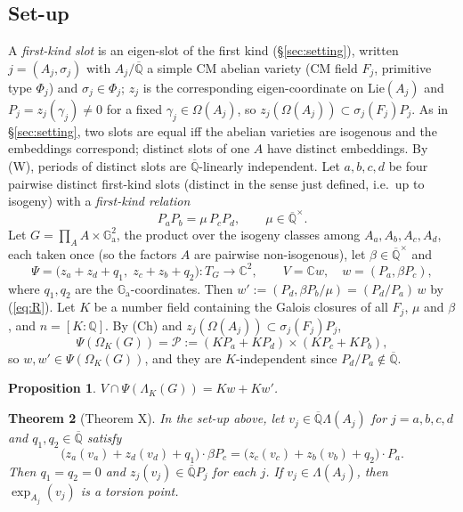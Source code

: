 \documentclass[11pt]{amsart}
\newtheorem{theorem}{Theorem}[section]
\newtheorem{proposition}[theorem]{Proposition}
\theoremstyle{definition}
\newcommand{\Qb}{\overline{\mathbb{Q}}}
\newcommand{\C}{\mathbb{C}}
\newcommand{\Q}{\mathbb{Q}}
\newcommand{\Ga}{\mathbb{G}_{\mathrm a}}
\begin{document}
\subsection{Set-up}
A \emph{first-kind slot} is an eigen-slot of the first kind (\S\ref{sec:setting}), written $j=(A_j,\sigma_j)$ with
$A_j/\Qb$ a simple CM abelian variety (CM field $F_j$, primitive type $\Phi_j$) and $\sigma_j\in\Phi_j$; $z_j$ is the
corresponding eigen-coordinate on $\mathrm{Lie}(A_j)$ and $P_j=z_j(\gamma_j)\ne0$ for a fixed $\gamma_j\in\Omega(A_j)$, so
$z_j(\Omega(A_j))\subset\sigma_j(F_j)P_j$. As in \S\ref{sec:setting}, two slots are equal iff the abelian varieties are
isogenous and the embeddings correspond; distinct slots of one $A$ have distinct embeddings. By (W), periods of distinct slots are $\Qb$-linearly independent. Let $a,b,c,d$ be four pairwise distinct
first-kind slots (distinct in the sense just defined, i.e.\ up to isogeny) with a \emph{first-kind relation}
\begin{equation}\label{eq:R}
P_aP_b=\mu\,P_cP_d,\qquad\mu\in\Qb^\times .
\end{equation}
Let $G=\prod_A A\times\Ga^2$, the product over the isogeny classes among $A_a,A_b,A_c,A_d$, each taken once (so the factors $A$ are pairwise non-isogenous), let
$\beta\in\Qb^\times$ and
\[
\Psi=\bigl(z_a+z_d+q_1,\;z_c+z_b+q_2\bigr)\colon T_G\to\C^2,\qquad V=\C w,\quad w=(P_a,\beta P_c),
\]
where $q_1,q_2$ are the $\Ga$-coordinates. Then $w':=(P_d,\beta P_b/\mu)=(P_d/P_a)\,w$ by (\ref{eq:R}). Let $K$ be a
number field containing the Galois closures of all $F_j$, $\mu$ and $\beta$, and $n=[K:\Q]$. By (Ch) and
$z_j(\Omega(A_j))\subset\sigma_j(F_j)P_j$,
\[
\Psi(\Omega_K(G))=\mathcal P:=(KP_a+KP_d)\times(KP_c+KP_b),
\]
so $w,w'\in\Psi(\Omega_K(G))$, and they are $K$-independent since $P_d/P_a\notin\Qb$.

\begin{proposition}\label{prop:X}
$V\cap\Psi(\Lambda_K(G))=Kw+Kw'$.
\end{proposition}

\begin{theorem}[Theorem X]\label{thm:X}
In the set-up above, let $v_j\in\Qb\Lambda(A_j)$ for $j=a,b,c,d$ and $q_1,q_2\in\Qb$ satisfy
\begin{equation}\label{eq:X}
\bigl(z_a(v_a)+z_d(v_d)+q_1\bigr)\cdot\beta P_c=\bigl(z_c(v_c)+z_b(v_b)+q_2\bigr)\cdot P_a .
\end{equation}
Then $q_1=q_2=0$ and $z_j(v_j)\in\Qb P_j$ for each $j$. If $v_j\in\Lambda(A_j)$, then $\exp_{A_j}(v_j)$ is a torsion point.
\end{theorem}
\end{document}
